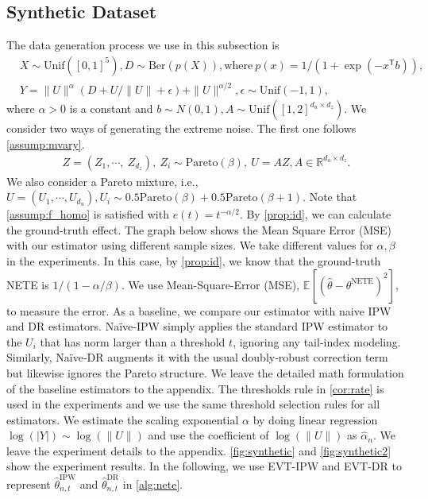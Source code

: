 \documentclass[12pt]{article}
\theoremstyle{plain}
\theoremstyle{definition}
\begin{document}
\subsection{Synthetic Dataset}\label{subsec:syn}
The data generation process we use in this subsection is 
\begin{align*}
    &X \sim \text{Unif}([0,1]^5), D \sim \text{Ber}(p(X)), \text{where} \  p(x) = 1/(1 + \exp(-x^\mathsf{T} b)), \\
    & Y = \| U \|^\alpha(D + U/\|U\| + \epsilon) + \| U \|^{\alpha/2}, \epsilon\sim\text{Unif}(-1,1), 
\end{align*}
where $\alpha > 0$ is a constant and $b\sim N(0,1), A \sim \text{Unif}([1,2]^{d_u\times d_z})$. We consider two ways of generating the extreme noise. The first one follows \cref{assump:mvary}. 
\begin{align*}
     Z = (Z_1,\cdots, \ Z_{d_z}), \ Z_i \sim \text{Pareto}(\beta),\ U = AZ, A \in \mathbb{R}^{d_u\times d_z}.
\end{align*}
We also consider a Pareto mixture, i.e., $ U = (U_1,\cdots, U_{d_u}), U_i \sim 0.5 \text{Pareto} (\beta) + 0.5 \text{Pareto}(\beta + 1) $.  Note that \cref{assump:f_homo} is satisfied with $ e(t) = t^{-\alpha/2} $. By \cref{prop:id}, we can calculate the ground-truth effect. The graph below shows the Mean Square Error (MSE) with our estimator using different sample sizes. We take different values for $\alpha, \beta$ in the experiments. In this case, by \cref{prop:id}, we know that the ground-truth NETE is $ {1}/{(1-\alpha/\beta)} $. We use Mean-Square-Error (MSE), $\mathbb{E}[(\hat{\theta} - \theta^{\text{NETE}})^2]$, to measure the error. As a baseline, we compare our estimator with naive IPW and DR estimators. Naïve‑IPW simply applies the standard IPW estimator to the $U_i$ that has norm larger than a threshold $t$, ignoring any tail‐index modeling. Similarly, Naïve‑DR augments it with the usual doubly‑robust correction term but likewise ignores the Pareto structure. We leave the detailed math formulation of the baseline estimators to the appendix. The thresholds rule in \cref{cor:rate} is used in the experiments and we use the same threshold selection rules for all estimators. We estimate the scaling exponential $\alpha$ by doing linear regression $ \log (|Y|) \sim \log (\|U\|)$ and use the coefficient of $\log(\|U\|)$ as $\hat{\alpha}_n$. We leave the experiment details to the appendix. \cref{fig:synthetic} and \cref{fig:synthetic2} show the experiment results. In the following, we use EVT-IPW and EVT-DR to represent $ \widehat{\theta}_{n,t}^{\mathrm{IPW}} $ and  $ \widehat{\theta}_{n,t}^{\mathrm{DR}} $ in \cref{alg:nete}.
\end{document}
